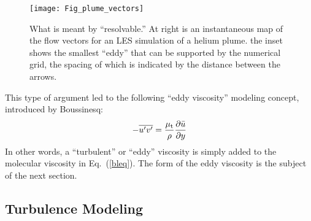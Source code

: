 \documentclass[graybox]{svmult}
\begin{document}
\begin{figure}[p]
\texttt{[image: Fig\_plume\_vectors]}
\caption{What is meant by ``resolvable.'' At right is an instantaneous map of the flow vectors for an LES simulation of a helium plume. the inset shows the smallest ``eddy'' that can be supported by the numerical grid, the spacing of which is indicated by the distance between the arrows.}
\label{vector_plot}
\end{figure}


This type of argument led to the following ``eddy viscosity'' modeling concept, introduced by Boussinesq:
\begin{equation}
-\overline{u'v'} = \frac{\mu_{\rm t}}{\rho} \frac{\partial \bar{u}}{\partial y}
\end{equation}
In other words, a ``turbulent'' or ``eddy'' viscosity is simply added to the molecular viscosity in Eq.~(\ref{bleq}). The form of the eddy viscosity is the subject of the next section.


\subsection{Turbulence Modeling}
\end{document}
